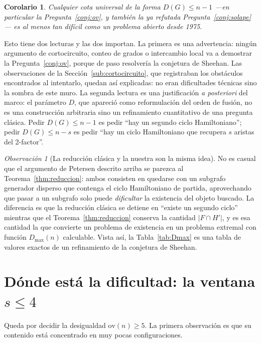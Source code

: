 \documentclass[11pt,a4paper]{article}
\newtheorem{corolario}[teorema]{Corolario}
\theoremstyle{definition}
\theoremstyle{remark}
\newtheorem{observacion}[teorema]{Observación}
\begin{document}
\begin{corolario}\label{cor:muro}
Cualquier cota universal de la forma $D(G)\le n-1$ —en particular la Pregunta~\ref{conj:ov}, y también la ya refutada Pregunta~\ref{conj:solape}— es al menos tan difícil como un problema abierto desde 1975.
\end{corolario}

Esto tiene dos lecturas y las dos importan. La primera es una advertencia: ningún argumento de cortocircuito, conteo de grados o intercambio local va a demostrar la Pregunta~\ref{conj:ov}, porque de paso resolvería la conjetura de Sheehan. Las observaciones de la Sección~\ref{sub:cortocircuito}, que registraban los obstáculos encontrados al intentarlo, quedan así explicadas: no eran dificultades técnicas sino la sombra de este muro. La segunda lectura es una justificación \emph{a posteriori} del marco: el parámetro $D$, que apareció como reformulación del orden de fusión, no es una construcción arbitraria sino un refinamiento cuantitativo de una pregunta clásica. Pedir $D(G)\le n-1$ es pedir ``hay un segundo ciclo Hamiltoniano''; pedir $D(G)\le n-s$ es pedir ``hay un ciclo Hamiltoniano que recupera $s$ aristas del 2-factor''.

\begin{observacion}[La reducción clásica y la nuestra son la misma idea]
No es casual que el argumento de Petersen descrito arriba se parezca al Teorema~\ref{thm:reduccion}: ambos consisten en quedarse con un subgrafo generador disperso que contenga el ciclo Hamiltoniano de partida, aprovechando que pasar a un subgrafo solo puede \emph{dificultar} la existencia del objeto buscado. La diferencia es que la reducción clásica se detiene en ``existe un segundo ciclo'' mientras que el Teorema~\ref{thm:reduccion} conserva la cantidad $|F\cap H'|$, y es esa cantidad la que convierte un problema de existencia en un problema extremal con función $D_{\max}(n)$ calculable. Vista así, la Tabla~\ref{tab:Dmax} es una tabla de valores exactos de un refinamiento de la conjetura de Sheehan.
\end{observacion}


\section{Dónde está la dificultad: la ventana $s\le4$}\label{sec:ventana}

Queda por decidir la desigualdad $\mathrm{ov}(n)\ge5$. La primera observación es que su contenido está concentrado en muy pocas configuraciones.
\end{document}
